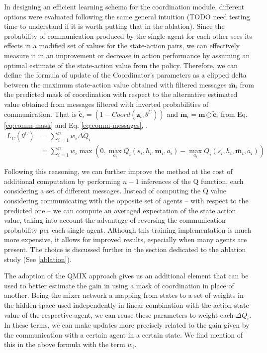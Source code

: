 \documentclass[a4paper,singleside,12pt]{report} %
\begin{document}
In designing an efficient learning schema for the coordination module, different options were evaluated following the same general intuition (TODO need testing time to understand if it is worth putting that in the ablation). Since the probability of communication produced by the single agent for each other sees its effects in a modified set of values for the state-action pairs, we can effectively measure it in an improvement or decrease in action performance by assuming an optimal estimate of the state-action value from the policy. Therefore, we can define the formula of update of the Coordinator's parameters as a clipped delta between the maximum state-action value obtained with filtered messages \(\bar{\textbf{m}}_i\) from the predicted mask of coordination with respect to the alternative estimated value obtained from messages filtered with inverted probabilities of communication. That is $\tilde{\textbf{c}}_i = (1- Coord(\textbf{z}_i; \theta^C))$ and $\tilde{\textbf{m}}_i = \textbf{m} \odot \tilde{\textbf{c}}_i$ from Eq. \ref{eq:comm-mask} and Eq. \ref{eq:comm-messages}, 
.
  \begin{equation}
    \begin{split}
    L_C(\theta^C) &= \sum^n_{i=1} w_i \Delta Q_i
    \\
    &=\sum^n_{i=1} w_i \max(0,\max_{a_i}Q_i(s_i,h_i,\tilde{\textbf{m}}_i,a_i) - \max_{a_i}Q_i(s_i,h_i,\bar{\textbf{m}}_i,a_i))
    \end{split}
  \end{equation}

Following this reasoning, we can further improve the method at the cost of additional computation by performing $n-1$ inferences of the Q function, each considering a set of different messages. Instead of computing the Q value considering communicating with the opposite set of agents -- with respect to the predicted one -- we can compute an averaged expectation of the state action value, taking into account the advantage of reversing the communication probability per each single agent. Although this training implementation is much more expensive, it allows for improved results, especially when many agents are present. The choice is discussed further in the section dedicated to the ablation study (See \ref{ablation}).

The adoption of the QMIX approach gives us an additional element that can be used to better estimate the gain in using a mask of coordination in place of another. Being the mixer network a mapping from states to a set of weights in the hidden space used independently in linear combination with the action-state value of the respective agent, we can reuse these parameters to weight each \(\Delta Q_i\). In these terms, we can make updates more precisely related to the gain given by the communication with a certain agent in a certain state. We find mention of this in the above formula with the term \(w_i\).
\end{document}
